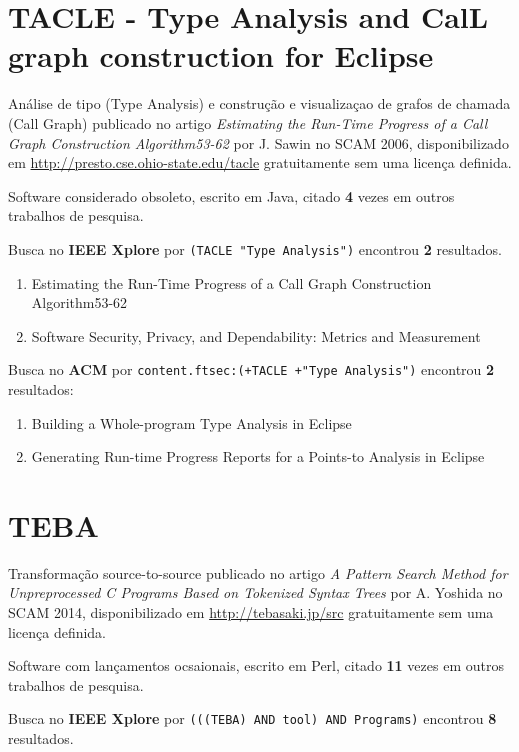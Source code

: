 \section{TACLE - Type Analysis and CalL graph construction for Eclipse}

Análise de tipo (Type Analysis) e construção e visualizaçao de grafos de chamada (Call Graph)
publicado no artigo {\it Estimating the Run-Time Progress of a Call Graph Construction Algorithm53-62}
por J. Sawin
no SCAM 2006,
disponibilizado em \url{http://presto.cse.ohio-state.edu/tacle}
gratuitamente
sem uma licença definida.

Software considerado obsoleto,
escrito em Java,
citado {\bf 4} vezes em outros trabalhos de pesquisa.

Busca no {\bf IEEE Xplore} por
\texttt{(TACLE "Type Analysis")}
encontrou {\bf 2}
resultados.

\begin{enumerate}
\item Estimating the Run-Time Progress of a Call Graph Construction Algorithm53-62
\item Software Security, Privacy, and Dependability: Metrics and Measurement
\end{enumerate}

Busca no {\bf ACM} por
\texttt{content.ftsec:(+TACLE +"Type Analysis")}
encontrou {\bf 2}
resultados:

\begin{enumerate}
\item Building a Whole-program Type Analysis in Eclipse
\item Generating Run-time Progress Reports for a Points-to Analysis in Eclipse
\end{enumerate}

\section{TEBA}

Transformação source-to-source
publicado no artigo {\it A Pattern Search Method for Unpreprocessed C Programs Based on Tokenized Syntax Trees}
por A. Yoshida
no SCAM 2014,
disponibilizado em \url{http://tebasaki.jp/src}
gratuitamente
sem uma licença definida.

Software com lançamentos ocsaionais,
escrito em Perl,
citado {\bf 11} vezes em outros trabalhos de pesquisa.

Busca no {\bf IEEE Xplore} por
\texttt{(((TEBA) AND tool) AND Programs)}
encontrou {\bf 8}
resultados.

